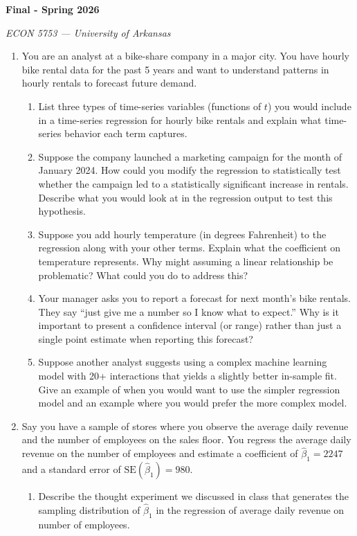\documentclass[12pt]{article}
\begin{document}
\begin{center}
  {\Huge\bf Final - Spring 2026}

  \smallskip
  {\large\it ECON 5753 — University of Arkansas}
\end{center}

\vspace{5mm}
\begin{enumerate}
  \item You are an analyst at a bike-share company in a major city. You have hourly bike rental data for the past 5 years and want to understand patterns in hourly rentals to forecast future demand.
    \begin{enumerate}
      \item List three types of time-series variables (functions of $t$) you would include in a time-series regression for hourly bike rentals and explain what time-series behavior each term captures.

      \item Suppose the company launched a marketing campaign for the month of January 2024.
        How could you modify the regression to statistically test whether the campaign led to a statistically significant increase in rentals.
        Describe what you would look at in the regression output to test this hypothesis.

      \item Suppose you add hourly temperature (in degrees Fahrenheit) to the regression along with your other terms. Explain what the coefficient on temperature represents.
        Why might assuming a linear relationship be problematic?
        What could you do to address this?

      \item Your manager asks you to report a forecast for next month's bike rentals.
        They say ``just give me a number so I know what to expect.''
        Why is it important to present a confidence interval (or range) rather than just a single point estimate when reporting this forecast?

      \item Suppose another analyst suggests using a complex machine learning model with 20+ interactions that yields a slightly better in-sample fit.
        Give an example of when you would want to use the simpler regression model and an example where you would prefer the more complex model.
    \end{enumerate}

    \newpage
    \vspace*{2\bigskipamount}
  \item Say you have a sample of stores where you observe the average daily revenue and the number of employees on the sales floor.
    You regress the average daily revenue on the number of employees and estimate a coefficient of $\hat{\beta}_1 = 2247$ and a standard error of $\text{SE}(\hat{\beta}_1) = 980$.
    \begin{enumerate}
      \item Describe the thought experiment we discussed in class that generates the sampling distribution of $\hat{\beta}_1$ in the regression of average daily revenue on number of employees.


\end{enumerate}
\end{enumerate}
\end{document}
